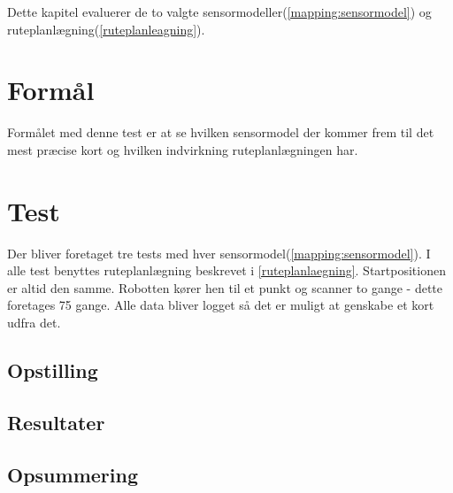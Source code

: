 Dette kapitel evaluerer de to valgte sensormodeller(\cref{mapping:sensormodel}) og ruteplanlægning(\cref{ruteplanleagning}).


\section{Formål}
Formålet med denne test er at se hvilken sensormodel der kommer frem til det mest præcise kort og hvilken indvirkning ruteplanlægningen har.

\section{Test}\label{evaluering:test_beskrivelse}
Der bliver foretaget tre tests med hver sensormodel(\cref{mapping:sensormodel}).
I alle test benyttes ruteplanlægning beskrevet i \cref{ruteplanlaegning}.
Startpositionen er altid den samme.
Robotten kører hen til et punkt og scanner to gange - dette foretages 75 gange.
Alle data bliver logget så det er muligt at genskabe et kort udfra det.

\subsection{Opstilling}

\subsection{Resultater}

\subsection{Opsummering}